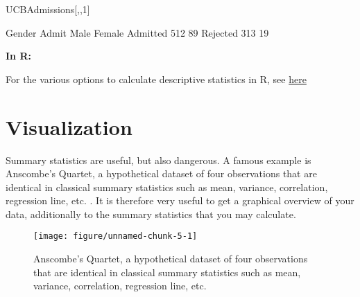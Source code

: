\documentclass[a4paper,twoside]{tufte-book}\usepackage[]{graphicx}\usepackage[]{color}
\makeatletter
\def\maxwidth{ %
  \ifdim\Gin@nat@width>\linewidth
    \linewidth
  \else
    \Gin@nat@width
  \fi
}
\makeatother
\begin{document}
\begin{Schunk}
\begin{Sinput}
UCBAdmissions[,,1]
\end{Sinput}
\begin{Soutput}
          Gender
Admit      Male Female
  Admitted  512     89
  Rejected  313     19
\end{Soutput}
\end{Schunk}


\vspace{1cm}
\begin{fullwidth}
\begin{mdframed}
    
\textbf{In R:} 

For the various options to calculate descriptive statistics in R, see \href{http://www.uni-kiel.de/psychologie/rexrepos/rerDescriptive.html}{here}

\end{mdframed}
\end{fullwidth} 


\section{Visualization}


Summary statistics are useful, but also dangerous. A famous example is Anscombe's Quartet, a hypothetical dataset of four observations that are identical in classical summary statistics such as mean, variance, correlation, regression line, etc. \citep{Anscombe-Graphsinstatistical-1973}. It is therefore very useful to get a graphical overview of your data, additionally to the summary statistics that you may calculate.

\begin{figure}[htbp]
\begin{center}
\begin{Schunk}

\texttt{[image: figure/unnamed-chunk-5-1]} \end{Schunk}
\caption{Anscombe's Quartet, a hypothetical dataset of four observations that are identical in classical summary statistics such as mean, variance, correlation, regression line, etc.}
\label{fig: Anscombes Quartet}
\end{center}
\end{figure}
\end{document}
